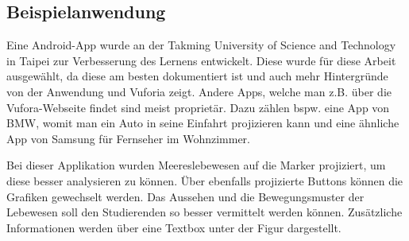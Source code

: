 \subsection{Beispielanwendung}
Eine Android-App wurde an der Takming University of Science and Technology in Taipei zur Verbesserung des Lernens entwickelt\cite{vuforia_sample_application}. Diese wurde für diese Arbeit ausgewählt, da diese am besten dokumentiert ist und auch mehr Hintergründe von der Anwendung und Vuforia zeigt. Andere Apps, welche man z.B. über die Vufora-Webseite findet sind meist proprietär. Dazu zählen bspw. eine App von BMW, womit man ein Auto in seine Einfahrt projizieren kann und eine ähnliche App von Samsung für Fernseher im Wohnzimmer.\par
Bei dieser Applikation wurden Meereslebewesen auf die Marker projiziert, um diese besser analysieren zu können. Über ebenfalls projizierte Buttons können die Grafiken gewechselt werden. Das Aussehen und die Bewegungsmuster der Lebewesen soll den Studierenden so besser vermittelt werden können. Zusätzliche Informationen werden über eine Textbox unter der Figur dargestellt.
